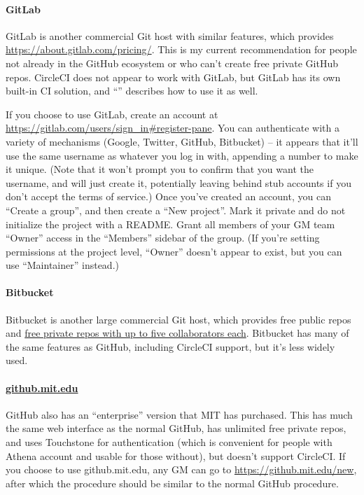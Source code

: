 \documentclass[green]{testgame}
\begin{document}
\paragraph*{GitLab} GitLab is another commercial Git host with similar features, which provides \href{free public and private repos to everyone}{https://about.gitlab.com/pricing/}. This is my current recommendation for people not already in the GitHub ecosystem or who can't create free private GitHub repos. CircleCI does not appear to work with GitLab, but GitLab has its own built-in CI solution, and ``\gCI{}'' describes how to use it as well.

If you choose to use GitLab, create an account at \url{https://gitlab.com/users/sign_in#register-pane}. You can authenticate with a variety of mechanisms (Google, Twitter, GitHub, Bitbucket) -- it appears that it'll use the same username as whatever you log in with, appending a number to make it unique. (Note that it won't prompt you to confirm that you want the username, and will just create it, potentially leaving behind stub accounts if you don't accept the terms of service.) Once you've created an account, you can ``Create a group'', and then create a ``New project''. Mark it private and do not initialize the project with a README. Grant all members of your GM team ``Owner'' access in the ``Members'' sidebar of the group. (If you're setting permissions at the project level, ``Owner'' doesn't appear to exist, but you can use ``Maintainer'' instead.)

\paragraph*{Bitbucket} Bitbucket is another large commercial Git host, which provides free public repos and \href{https://bitbucket.org/product/pricing/}{free private repos with up to five collaborators each}. Bitbucket has many of the same features as GitHub, including CircleCI support, but it's less widely used.

\paragraph*{\href{https://github.mit.edu}{github.mit.edu}} GitHub also has an ``enterprise'' version that MIT has purchased. This has much the same web interface as the normal GitHub, has unlimited free private repos, and uses Touchstone for authentication (which is convenient for people with Athena account and usable for those without), but doesn't support CircleCI. If you choose to use github.mit.edu, any GM can go to \url{https://github.mit.edu/new}, after which the procedure should be similar to the normal GitHub procedure.
\end{document}
